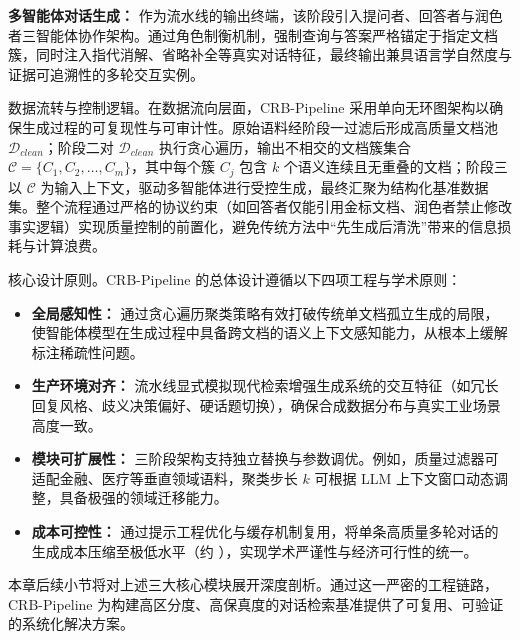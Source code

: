 \textbf{多智能体对话生成：} 作为流水线的输出终端，该阶段引入提问者、回答者与润色者三智能体协作架构。通过角色制衡机制，强制查询与答案严格锚定于指定文档簇，同时注入指代消解、省略补全等真实对话特征，最终输出兼具语言学自然度与证据可追溯性的多轮交互实例。




数据流转与控制逻辑。在数据流向层面，CRB-Pipeline 采用单向无环图架构以确保生成过程的可复现性与可审计性。原始语料经阶段一过滤后形成高质量文档池 $\mathcal{D}_{clean}$；阶段二对 $\mathcal{D}_{clean}$ 执行贪心遍历，输出不相交的文档簇集合 $\mathcal{C} = \{C_1, C_2, \dots, C_m\}$，其中每个簇 $C_j$ 包含 $k$ 个语义连续且无重叠的文档；阶段三以 $\mathcal{C}$ 为输入上下文，驱动多智能体进行受控生成，最终汇聚为结构化基准数据集。整个流程通过严格的协议约束（如回答者仅能引用金标文档、润色者禁止修改事实逻辑）实现质量控制的前置化，避免传统方法中“先生成后清洗”带来的信息损耗与计算浪费。



核心设计原则。CRB-Pipeline 的总体设计遵循以下四项工程与学术原则：

\begin{itemize}

    \item \textbf{全局感知性：} 通过贪心遍历聚类策略有效打破传统单文档孤立生成的局限，使智能体模型在生成过程中具备跨文档的语义上下文感知能力，从根本上缓解标注稀疏性问题。

    \item \textbf{生产环境对齐：} 流水线显式模拟现代检索增强生成系统的交互特征（如冗长回复风格、歧义决策偏好、硬话题切换），确保合成数据分布与真实工业场景高度一致。

    \item \textbf{模块可扩展性：} 三阶段架构支持独立替换与参数调优。例如，质量过滤器可适配金融、医疗等垂直领域语料，聚类步长 $k$ 可根据 LLM 上下文窗口动态调整，具备极强的领域迁移能力。

    \item \textbf{成本可控性：} 通过提示工程优化与缓存机制复用，将单条高质量多轮对话的生成成本压缩至极低水平（约 ），实现学术严谨性与经济可行性的统一。

\end{itemize}



本章后续小节将对上述三大核心模块展开深度剖析。通过这一严密的工程链路，CRB-Pipeline 为构建高区分度、高保真度的对话检索基准提供了可复用、可验证的系统化解决方案。





